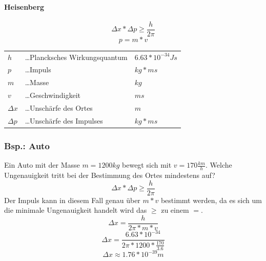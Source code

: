 \documentclass{school}
\begin{document}
\paragraph{Heisenberg}
$$\Delta x * \Delta p \ge \frac{h}{2\pi}$$
\vspace{0.25 em}
$$p = m * v$$

\begin{center}
    \begin{tabular}{l l l}
        $h$ &\dots Plancksches Wirkungsquantum & $6.63 * 10^{-34} Js$\\
        $p$ &\dots Impuls & ${kg * m}{s}$\\
        $m$ &\dots Masse & ${kg}$\\
        $v$ &\dots Geschwindigkeit & ${m}{s}$\\
        $\Delta x$ &\dots Unschärfe des Ortes & ${m}$\\
        $\Delta p$ &\dots Unschärfe des Impulses & ${kg * m}{s}$
    \end{tabular}
\end{center}

\subsubsection{Bsp.: Auto}
Ein Auto mit der Masse $m = 1200 kg$ bewegt sich mit $v = 170 \frac{km}{h}$.
Welche Ungenauigkeit tritt bei der Bestimmung des Ortes mindestens auf?
$$\Delta x * \Delta p \ge \frac{h}{2\pi}$$
Der Impuls kann in diesem Fall genau über $m * v$ bestimmt werden, da es sich um die minimale Ungenauigkeit handelt wird das $\ge$ zu einem $=$.
$$\Delta x = \frac{h}{2\pi * m * v}$$
$$\Delta x = \frac{6.63 * 10^{-34}}{2\pi * 1200 * \frac{170}{3.6}}$$
$$\Delta x \approx 1.76 * 10^{-39} m$$

\newpage
\end{document}
